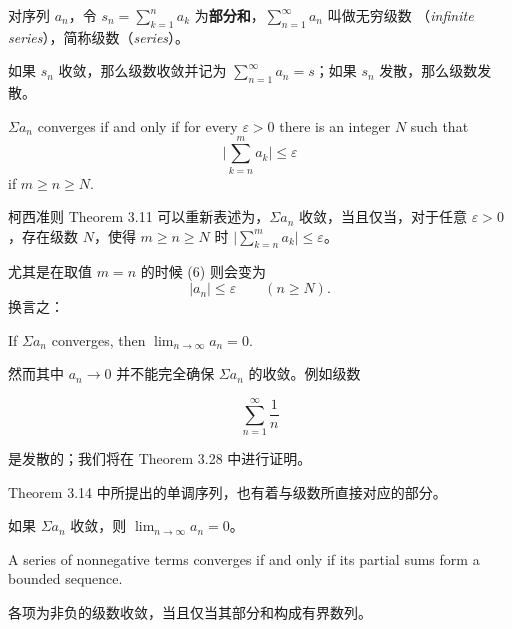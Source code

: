 \documentclass[../poma-notes.tex]{subfiles}
\begin{document}
\begin{anote}\mbox{}\par
  对序列 $a_n$，令 $s_n = \sum_{k=1}^{n} a_k$ 为\textbf{部分和}，$\sum_{n=1}^{\infty} a_n$ 叫做无穷级数
  （\textit{infinite series}），简称级数（\textit{series}）。

  如果 $s_n$ 收敛，那么级数收敛并记为 $\sum_{n=1}^{\infty} a_n = s$；如果 $s_n$ 发散，那么级数发散。
\end{anote}

\begin{theorem}
  $\Sigma a_n$ converges if and only if for every $\varepsilon > 0$ there is an integer $N$ such that
  \begin{equation}
    \Bigg| \sum_{k=n}^{m} a_k \Bigg| \le \varepsilon
  \end{equation}
  if $m \ge n \ge N$.
\end{theorem}

\begin{anote}
  柯西准则 Theorem 3.11 可以重新表述为，$\Sigma a_n$ 收敛，当且仅当，对于任意 $\varepsilon > 0$，存在级数 $N$，使得
  $m \ge n \ge N$ 时 $\big| \sum_{k=n}^{m} a_k \big| \le \varepsilon$。
\end{anote}

尤其是在取值 $m = n$ 的时候 (6) 则会变为
\[|a_n| \le \varepsilon \qquad (n \ge N).\]
换言之：

\begin{theorem}
  If $\Sigma a_n$ converges, then $\lim_{n \to \infty} a_n = 0$.
\end{theorem}

然而其中 $a_n \to 0$ 并不能完全确保 $\Sigma a_n$ 的收敛。例如级数

\[\sum_{n=1}^{\infty} \frac{1}{n}\]

是发散的；我们将在 Theorem 3.28 中进行证明。

Theorem 3.14 中所提出的单调序列，也有着与级数所直接对应的部分。

\begin{anote}
  如果 $\Sigma a_n$ 收敛，则 $\lim_{n \to \infty} a_n = 0$。
\end{anote}

\begin{theorem}
  A series of nonnegative terms converges if and only if its partial sums form a bounded sequence.
\end{theorem}

\begin{anote}
  各项为非负的级数收敛，当且仅当其部分和构成有界数列。
\end{anote}
\end{document}
